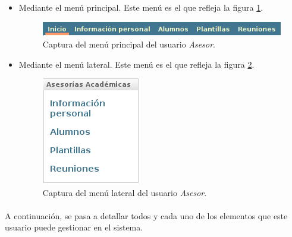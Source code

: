   \begin{itemize}
   \item Mediante el menú principal. Este menú es el que refleja la figura
   \ref{capturaMenuPrincipalAsesor}.

  \begin{figure}[!ht]
    \begin{center}
      \includegraphics[scale=0.55]{4.Funcionamiento_Aplicacion/4.3.Gestion/4.3.3.Asesor/4.3.3.1.Introduccion/menu_principal.png}
      \caption{Captura del menú principal del usuario \textit{Asesor}.}
      \label{capturaMenuPrincipalAsesor}
    \end{center}
  \end{figure}

   \item Mediante el menú lateral. Este menú es el que refleja la figura
   \ref{capturaMenuLateralAsesor}.

   \begin{figure}[!ht]
    \begin{center}
      \includegraphics[scale=0.55]{4.Funcionamiento_Aplicacion/4.3.Gestion/4.3.3.Asesor/4.3.3.1.Introduccion/menu_lateral.png}
      \caption{Captura del menú lateral del usuario \textit{Asesor}.}
      \label{capturaMenuLateralAsesor}
    \end{center}
  \end{figure}

  \end{itemize}

  \paragraph{}A continuación, se pasa a detallar todos y cada uno de los
  elementos que este usuario puede gestionar en el sistema.
